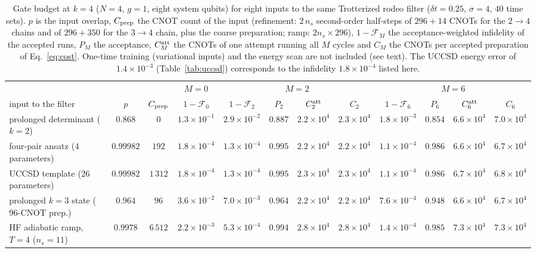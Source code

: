 \documentclass[
  aps,            %
  prc,            %
  reprint,        %
  superscriptaddress,
  floatfix,
  nofootinbib
]{revtex4-2}
\begin{document}
\begin{table}[t]
\caption{\label{tab:depth}Gate budget at $k=4$ ($N=4$, $g=1$, eight system
qubits) for eight inputs to the same Trotterized rodeo filter
($\delta t=0.25$, $\sigma=4$, $40$ time sets).  $p$ is the input overlap,
$C_{\rm prep}$ the CNOT count of the input (refinement: $2\,n_s$ second-order
half-steps of $296+14$ CNOTs for the $2\to4$ chains and of $296+350$ for the
$3\to4$ chain, plus the coarse preparation; ramp: $2n_s\times296$),
$1-\mathcal F_M$ the acceptance-weighted infidelity of the accepted runs,
$P_M$ the acceptance, $C^{\rm att}_M$ the CNOTs of one attempt running all
$M$ cycles and $C_M$ the CNOTs per accepted preparation of
Eq.~\eqref{eq:cost}.  One-time training (variational inputs) and the energy
scan are not included (see text).  The UCCSD energy error of
$1.4\times10^{-3}$ (Table~\ref{tab:uccsd}) corresponds to the infidelity
$1.8\times10^{-4}$ listed here.}
\scriptsize
\begin{ruledtabular}
\begin{tabular}{lcc c cccc cccc}
 & & & $M=0$ & \multicolumn{4}{c}{$M=2$} & \multicolumn{4}{c}{$M=6$}\\
input to the filter & $p$ & $C_{\rm prep}$ & $1-\mathcal F_0$ & $1-\mathcal F_2$ & $P_2$ & $C^{\rm att}_2$ & $C_2$ & $1-\mathcal F_6$ & $P_6$ & $C^{\rm att}_6$ & $C_6$\\
\colrule
prolonged determinant ($k{=}2$) & $0.868$ & $0$ & $1.3\times10^{-1}$ & $2.9\times10^{-2}$ & $0.887$ & $2.2\times10^{4}$ & $2.3\times10^{4}$ & $1.8\times10^{-3}$ & $0.854$ & $6.6\times10^{4}$ & $7.0\times10^{4}$\\
four-pair ansatz ($4$ parameters) & $0.99982$ & $192$ & $1.8\times10^{-4}$ & $1.3\times10^{-4}$ & $0.995$ & $2.2\times10^{4}$ & $2.2\times10^{4}$ & $1.1\times10^{-4}$ & $0.986$ & $6.6\times10^{4}$ & $6.7\times10^{4}$\\
UCCSD template ($26$ parameters) & $0.99982$ & $1\,312$ & $1.8\times10^{-4}$ & $1.3\times10^{-4}$ & $0.995$ & $2.3\times10^{4}$ & $2.3\times10^{4}$ & $1.1\times10^{-4}$ & $0.986$ & $6.7\times10^{4}$ & $6.8\times10^{4}$\\
prolonged $k{=}3$ state ($96$-CNOT prep.) & $0.964$ & $96$ & $3.6\times10^{-2}$ & $7.0\times10^{-3}$ & $0.964$ & $2.2\times10^{4}$ & $2.2\times10^{4}$ & $7.6\times10^{-4}$ & $0.948$ & $6.6\times10^{4}$ & $6.7\times10^{4}$\\
HF adiabatic ramp, $T{=}4$ ($n_s{=}11$) & $0.9978$ & $6\,512$ & $2.2\times10^{-3}$ & $5.3\times10^{-4}$ & $0.994$ & $2.8\times10^{4}$ & $2.8\times10^{4}$ & $1.4\times10^{-4}$ & $0.985$ & $7.3\times10^{4}$ & $7.3\times10^{4}$\\

\end{tabular}
\end{ruledtabular}
\end{table}
\end{document}
